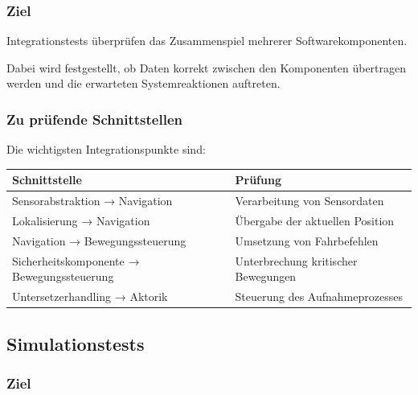 \documentclass[
  a4paper,
  12pt,
  DIV=12,        %
  parskip=half,  %
  headings=small %
]{scrartcl}
\theoremstyle{definition}
\theoremstyle{definition}
\begin{document}
\subsubsection{Ziel}\label{ziel-1}

Integrationstests überprüfen das Zusammenspiel mehrerer
Softwarekomponenten.

Dabei wird festgestellt, ob Daten korrekt zwischen den Komponenten
übertragen werden und die erwarteten Systemreaktionen auftreten.

\subsubsection{Zu prüfende
Schnittstellen}\label{zu-pruxfcfende-schnittstellen}

Die wichtigsten Integrationspunkte sind:

\begin{longtable}[]{@{}
  >{\raggedright\arraybackslash}p{}
  >{\raggedright\arraybackslash}p{}@{}}
\toprule\noalign{}
\begin{minipage}[b]{\linewidth}\raggedright
Schnittstelle
\end{minipage} & \begin{minipage}[b]{\linewidth}\raggedright
Prüfung
\end{minipage} \\
\midrule\noalign{}
\endhead
\bottomrule\noalign{}
\endlastfoot
Sensorabstraktion → Navigation & Verarbeitung von Sensordaten \\
Lokalisierung → Navigation & Übergabe der aktuellen Position \\
Navigation → Bewegungssteuerung & Umsetzung von Fahrbefehlen \\
Sicherheitskomponente → Bewegungssteuerung & Unterbrechung kritischer
Bewegungen \\
Untersetzerhandling → Aktorik & Steuerung des Aufnahmeprozesses \\
\end{longtable}

\subsection{Simulationstests}\label{simulationstests}

\subsubsection{Ziel}\label{ziel-2}
\end{document}
